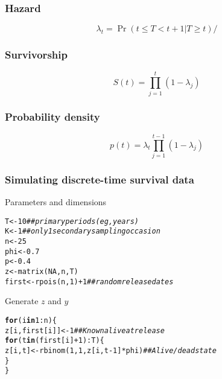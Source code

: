 \documentclass[color=usenames,dvipsnames]{beamer}\usepackage[]{graphicx}\usepackage[]{color}
\makeatletter
\newcommand{\hlnum}[1]{\textcolor[rgb]{0.69,0.494,0}{#1}}%
\newcommand{\hlcom}[1]{\textcolor[rgb]{0.514,0.506,0.514}{\textit{#1}}}%
\newcommand{\hlopt}[1]{\textcolor[rgb]{0,0,0}{#1}}%
\newcommand{\hlstd}[1]{\textcolor[rgb]{0,0,0}{#1}}%
\newcommand{\hlkwa}[1]{\textcolor[rgb]{0,0,0}{\textbf{#1}}}%
\newcommand{\hlkwb}[1]{\textcolor[rgb]{0,0.341,0.682}{#1}}%
\newcommand{\hlkwd}[1]{\textcolor[rgb]{0.004,0.004,0.506}{#1}}%
\newenvironment{kframe}{%
 \def\at@end@of@kframe{}%
 \ifinner\ifhmode%
  \def\at@end@of@kframe{\end{minipage}}%
  \begin{minipage}{\columnwidth}%
 \fi\fi%
 \def\FrameCommand##1{\hskip\@totalleftmargin \hskip-\fboxsep
 \colorbox{shadecolor}{##1}\hskip-\fboxsep
     \hskip-\linewidth \hskip-\@totalleftmargin \hskip\columnwidth}%
 \MakeFramed {\advance\hsize-\width
   \@totalleftmargin\z@ \linewidth\hsize
   \@setminipage}}%
 {\par\unskip\endMakeFramed%
 \at@end@of@kframe}
\newenvironment{knitrout}{}{} %
\makeatother
\begin{document}
\begin{frame}
  \frametitle{Hazard}
  \[
    \lambda_t = \Pr(t \le T < t+1 | T\ge t)/
  \]
\end{frame}


\begin{frame}
  \frametitle{Survivorship}
  \[
    S(t) = \prod_{j=1}^t (1-\lambda_j)
  \]
\end{frame}


\begin{frame}
  \frametitle{Probability density}
  \[
    p(t) = \lambda_t \prod_{j=1}^{t-1} (1-\lambda_j)
  \]
\end{frame}





\begin{frame}[fragile]
  \frametitle{Simulating discrete-time survival data}
  {%
    Parameters and dimensions}
\begin{knitrout}\footnotesize
{}\color{fgcolor}\begin{kframe}
\begin{alltt}
\hlstd{T} \hlkwb{<-} \hlnum{10}               \hlcom{## primary periods (eg, years)}
\hlstd{K} \hlkwb{<-} \hlnum{1}                \hlcom{## only 1 secondary sampling occasion}
\hlstd{n} \hlkwb{<-} \hlnum{25}
\hlstd{phi} \hlkwb{<-} \hlnum{0.7}
\hlstd{p} \hlkwb{<-} \hlnum{0.4}
\hlstd{z} \hlkwb{<-} \hlkwd{matrix}\hlstd{(}\hlnum{NA}\hlstd{, n, T)}
\hlstd{first} \hlkwb{<-} \hlkwd{rpois}\hlstd{(n,} \hlnum{1}\hlstd{)}\hlopt{+}\hlnum{1} \hlcom{## random release dates}
\end{alltt}
\end{kframe}
\end{knitrout}
\pause
\vfill
{%
  Generate $z$ and $y$}
\begin{knitrout}\footnotesize
{}\color{fgcolor}\begin{kframe}
\begin{alltt}
\hlkwa{for}\hlstd{(i} \hlkwa{in} \hlnum{1}\hlopt{:}\hlstd{n) \{}
    \hlstd{z[i,first[i]]} \hlkwb{<-} \hlnum{1}  \hlcom{## Known alive at release}
    \hlkwa{for}\hlstd{(t} \hlkwa{in} \hlstd{(first[i]}\hlopt{+}\hlnum{1}\hlstd{)}\hlopt{:}\hlstd{T) \{}
        \hlstd{z[i,t]} \hlkwb{<-} \hlkwd{rbinom}\hlstd{(}\hlnum{1}\hlstd{,} \hlnum{1}\hlstd{, z[i,t}\hlopt{-}\hlnum{1}\hlstd{]}\hlopt{*}\hlstd{phi)} \hlcom{## Alive/dead state}
    \hlstd{\}}
\hlstd{\}}
\end{alltt}
\end{kframe}
\end{knitrout}
\end{frame}
\end{document}
